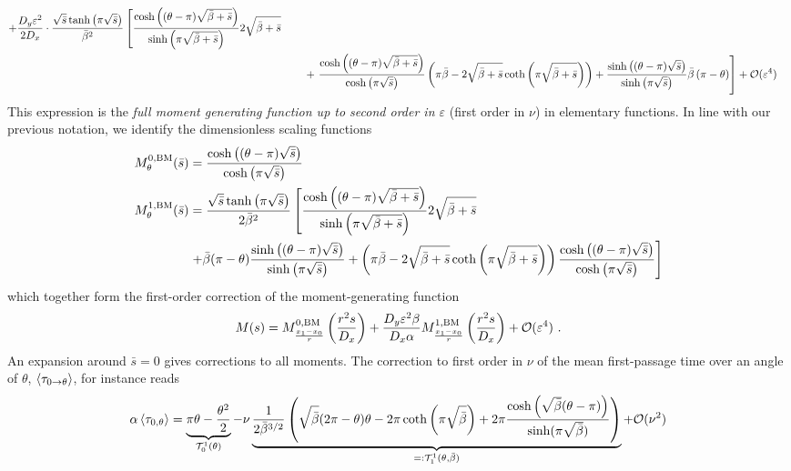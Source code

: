 \documentclass[%
 reprint,
superscriptaddress,
nofootinbib,
 amsmath,amssymb,
 aps,
prx,
]{revtex4-2}
\begin{document}
\begin{widetext}
\begin{align}
	+ \frac{D_y \varepsilon^2}{2 D_x} \cdot
	\frac{\sqrt{\bar{s}}\tanh\left( \pi \sqrt{\bar{s}} \right)}{{\bar{\beta}}^2} \left[ \frac{\cosh\left( (\theta - \pi)\sqrt{\bar{\beta}+\bar{s}} \right)}{\sinh\left( \pi\sqrt{\bar{\beta}+\bar{s}} \right)}2\sqrt{\bar{\beta}+\bar{s}}\right.
		\nonumber \\
	& \qquad + \left.\frac{\cosh\left( (\theta-\pi) \sqrt{\bar{\beta}+\bar{s}} \right)}{ \cosh\left( \pi \sqrt{\bar{s}} \right)} \left( \pi\bar{\beta}-2\sqrt{\bar{\beta}+\bar{s}} \coth\left( \pi \sqrt{\bar{\beta}+\bar{s}} \right) \right)+ \frac{\sinh\left( (\theta-\pi)\sqrt{\bar{s}} \right)}{\sinh\left( \pi\sqrt{\bar{s}} \right)}\bar{\beta}\left( \pi-\theta \right) \right] + \mathcal{O}(\varepsilon^4)
	\label{eq:bmou_full_mgf}
\end{align}
This expression is the \emph{full moment generating function up to second order in $\varepsilon$} (first order in $\nu$) in elementary functions. In line with our previous notation, we identify the dimensionless scaling functions
\begin{align}
  M^{0, \rm{BM}}_{\theta} (\bar{s})  &= \frac{\cosh\left( (\theta - \pi)\sqrt{\bar{s}} \right)}{ \cosh\left( \pi\sqrt{\bar{s}}  \right)} \label{eq:mgf0_bmou} \\
 M^{1, \rm{BM}}_{\theta} (\bar{s}) &= \frac{\sqrt{\bar{s}}\tanh\left( \pi \sqrt{\bar{s}} \right)}{2 {\bar{\beta}}^2}\left[ \frac{\cosh\left( (\theta - \pi)\sqrt{\bar{\beta}+\bar{s}} \right)}{\sinh\left( \pi\sqrt{\bar{\beta}+\bar{s}} \right)}2\sqrt{\bar{\beta}+\bar{s}}\right.   \label{eq:mgf1_bmou} \nonumber	\\
   &\left.+ \bar{\beta}  (\pi -\theta ) \frac{\sinh \left((\theta -\pi ) \sqrt{\bar{s} }\right)}{\sinh\left(\pi  \sqrt{\bar{s} }\right)}+\left(\pi  \bar{\beta} -2 \sqrt{\bar{\beta} +\bar{s} } \coth \left(\pi  \sqrt{\bar{\beta} +\bar{s} }\right)\right) \frac{\cosh \left((\theta -\pi ) \sqrt{\bar{s} }\right)}{\cosh \left(\pi  \sqrt{\bar{s} }\right)} \right]
\end{align}
which together form the first-order correction of the moment-generating function
\begin{align}
 M(s) =M^{0, \rm{BM}}_{\frac{x_1-x_0}{r}} \left( \frac{r^2 s}{D_x} \right) + \frac{D_y  \varepsilon^2 \beta}{D_x \alpha}M^{1, \rm{BM}}_{\frac{x_1-x_0}{r}} \left( \frac{r^2 s}{D_x} \right) +\mathcal{O}(\varepsilon^4)\ .
\end{align}
An expansion around $\bar{s} = 0$ gives corrections to all moments. The correction to first order in $\nu$ of the  mean first-passage time over an angle of $\theta$, $\left\langle {\tau_{0\to \theta}} \right\rangle$, for instance reads
\begin{align}
	\alpha\left\langle {\tau_{0, \theta}} \right\rangle = \underbrace{\pi \theta - \frac{\theta^2}{2}}_{\mathcal{T}^1_0(\theta)}- \nu \underbrace{\frac{1}{2 {\bar{\beta}}^{3/2}} \left( \sqrt{\bar{\beta}}(2\pi-\theta)\theta- 2\pi \coth\left( \pi \sqrt{\bar{\beta}} \right)+2\pi\frac{\cosh\left( \sqrt{\bar{\beta}}(\theta - \pi) \right)}{\sinh(\pi \sqrt{\bar{\beta}})} \right)  }_{=: \mathcal{T}^1_1(\theta, \bar{\beta})} + \mathcal{O}(\nu^2)
	\label{eq:mfpt_full}
\end{align}
\end{widetext}
\end{document}
